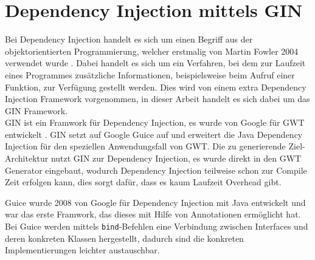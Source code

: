 \section{Dependency Injection mittels GIN} \label{GIN}
Bei Dependency Injection handelt es sich um einen Begriff aus der
objektorientierten Programmierung, welcher erstmalig von Martin Fowler 2004
verwendet wurde \cite{bib:DI}. Dabei handelt es sich um
ein Verfahren, bei dem zur Laufzeit eines Programmes zusätzliche Informationen,
beispielsweise beim Aufruf einer Funktion, zur Verfügung gestellt werden. Dies
wird von einem extra Dependency Injection Framework vorgenommen, in dieser
Arbeit handelt es sich dabei um das GIN Framework.
\\

GIN ist ein Framwork für Dependency Injection, es wurde von Google
für GWT entwickelt \cite[GIN]{bib:gin}. GIN setzt auf Google Guice
\cite[Guice]{bib:guice} auf und erweitert die Java Dependency Injection für den
speziellen Anwendungsfall von GWT. Die zu generierende Ziel-Architektur nutzt
GIN zur Dependency Injection, es wurde direkt in den GWT Generator eingebaut,
wodurch Dependency Injection teilweise schon zur Compile Zeit erfolgen kann,
dies sorgt dafür, dass es kaum Laufzeit Overhead gibt.

Guice wurde 2008 von Google für Dependency Injection mit Java entwickelt und war
das erste Framwork, das dieses mit Hilfe von Annotationen
ermöglicht hat. Bei Guice werden mittels \texttt{bind}-Befehlen eine Verbindung
zwischen Interfaces und deren konkreten Klassen hergestellt, dadurch sind die konkreten
Implementierungen leichter austauschbar.
